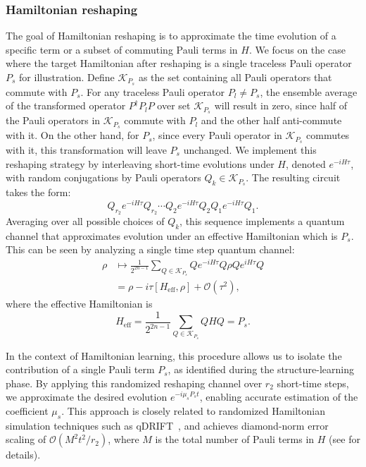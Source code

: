 \documentclass[twocolumn,superscriptaddress,aps,showpacs,amsmath,amstex,amssymb,citeautoscript,floatfix,pra,preprintnumbers]{revtex4-2}
\theoremstyle{plain}
\theoremstyle{plain}
\theoremstyle{plain}
\theoremstyle{plain}
\theoremstyle{plain}
\theoremstyle{plain}
\begin{document}
\subsubsection{Hamiltonian reshaping}

The goal of Hamiltonian reshaping is to approximate the time evolution of a specific term or a subset of commuting Pauli terms in $H$. 
We focus on the case where the target Hamiltonian after reshaping is a single traceless Pauli operator $P_s$ for illustration. Define $\mathcal{K}_{P_s}$ as the set containing all Pauli operators that commute with $P_s$. For any traceless Pauli operator $P_l\neq P_s$, the ensemble average of the transformed operator $P^{\dagger}P_lP$ over set $\mathcal{K}_{P_s}$ will result in zero, since half of the Pauli operators in $\mathcal{K}_{P_s}$ commute with $P_l$ and the other half anti-commute with it. On the other hand, for $P_s$, since every Pauli operator in $\mathcal{K}_{P_s}$ commutes with it, this transformation will leave $P_s$ unchanged. We implement this reshaping strategy by interleaving short-time evolutions under $H$, denoted $e^{-iH\tau}$, with random conjugations by Pauli operators $Q_k \in \mathcal{K}_{P_s}$. The resulting circuit takes the form:
\begin{equation}
    \label{eq:hamiltonian_reshaping}
    Q_{r_2} e^{-iH\tau}Q_{r_2}\cdots Q_2 e^{-iH\tau}Q_2Q_1 e^{-iH\tau}Q_1.
\end{equation}
Averaging over all possible choices of $Q_k$, this sequence implements a quantum channel that approximates evolution under an effective Hamiltonian which is $P_s$. This can be seen by analyzing a single time step quantum channel:
\begin{equation}
\begin{aligned}
    \rho &\mapsto \frac{1}{2^{2n-1}}\sum_{Q\in \mathcal{K}_{P_s}} Qe^{-iH\tau}Q\rho Qe^{iH\tau}Q 
    \\
    &= \rho - i\tau [H_{\mathrm{eff}},\rho]+\mathcal{O}(\tau^2) 
    ,
\end{aligned}
\end{equation}
where the effective Hamiltonian is
\begin{equation}
    H_{\mathrm{eff}} = \frac{1}{2^{2n-1}}\sum_{Q\in \mathcal{K}_{P_s}} QHQ=P_s.
\end{equation}

In the context of Hamiltonian learning, this procedure allows us to isolate the contribution of a single Pauli term $P_s$, as identified during the structure-learning phase. By applying this randomized reshaping channel over $r_2$ short-time steps, we approximate the desired evolution $e^{-i \mu_s P_s t}$, enabling accurate estimation of the coefficient $\mu_s$. This approach is closely related to randomized Hamiltonian simulation techniques such as qDRIFT~\cite{qDrift,ConcentrationForRPF}, and achieves diamond-norm error scaling of $\mathcal{O}(M^2t^2/r_2)$, where $M$ is the total number of Pauli terms in $H$ (see  for details).
\end{document}
